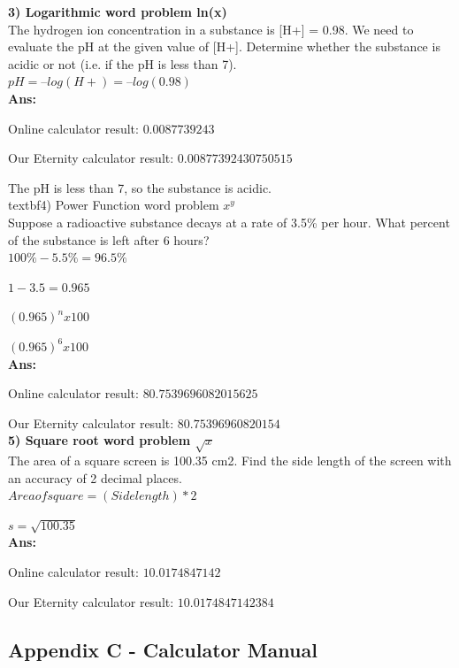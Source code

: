\documentclass[a4paper, 12pt]{article}
\begin{document}
\textbf{3) Logarithmic word problem ln(x)}
\\

The hydrogen ion concentration in a substance is [H+] = 0.98. We need to evaluate the pH at the given value of [H+]. Determine whether the substance is acidic or not (i.e. if the pH is less than 7).
\\

$pH = – log(H+) = – log(0.98)$
\\

\textbf{Ans:}

Online calculator result: $0.0087739243$

Our Eternity calculator result: $0.00877392430750515$

The pH is less than 7, so the substance is acidic.
\\

textbf{4) Power Function word problem $x^y$}
\\

Suppose a radioactive substance decays at a rate of 3.5\% per hour. What percent of the substance is left after 6 hours? 
\\

$100\%-5.5\% = 96.5\%$

$1-3.5 = 0.965$

$(0.965)^n x 100$

$(0.965)^6 x 100$
\\

\textbf{Ans:}

Online calculator result: $80.7539696082015625$

Our Eternity calculator result: $80.75396960820154$
\\

\textbf{5) Square root word problem $\sqrt{x}$}
\\

The area of a square screen is 100.35 cm2. Find the side length of the screen with an accuracy of 2 decimal places.
\\

$Area of square = (Side length) * 2$

$s = \sqrt{100.35}$
\\

\textbf{Ans:}

Online calculator result: $10.0174847142$

Our Eternity calculator result: $10.0174847142384$

\pagebreak

\subsection{Appendix C - Calculator Manual}
\end{document}
